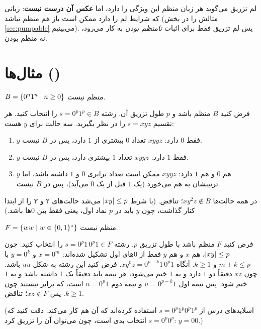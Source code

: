 \begin{warning}
لم تزریق می‌گوید هر زبان منظم این ویژگی را دارد، اما \textbf{عکس آن درست نیست}: زبانی که شرایط لم را دارد ممکن است باز هم منظم نباشد (مثالش را در بخش \ref{sec:pumpable} می‌بینیم). پس لم تزریق فقط برای اثبات \emph{نامنظم بودن} به کار می‌رود، نه منظم بودن.
\end{warning}

\section{مثال‌ها ()}

\begin{example}[$0^n1^n$]\label{ex:0n1n}
$B=\{0^n1^n\mid n\ge0\}$ منظم نیست.

فرض کنید $B$ منظم باشد و $p$ طول تزریق آن. رشته $s=0^p1^p\in B$ را انتخاب کنید. هر تقسیم $s=xyz$ را در نظر بگیرید. سه حالت برای $y$ هست:
\begin{enumerate}
\item $y$ فقط $0$ دارد: $xyyz$ تعداد $0$ بیشتری از $1$ دارد، پس در $B$ نیست.
\item $y$ فقط $1$ دارد: $xyyz$ تعداد $1$ بیشتری دارد، پس در $B$ نیست.
\item $y$ هم $0$ و هم $1$ دارد: $xyyz$ ممکن است تعداد برابری $0$ و $1$ داشته باشد، اما ترتیبشان به هم می‌خورد (یک $1$ قبل از یک $0$ می‌آید)، پس در $B$ نیست.
\end{enumerate}
در همه حالت‌ها $xy^2z\notin B$؛ تناقض. (با شرط $\lvert xy\rvert\le p$ می‌شد حالت‌های ۲ و ۳ را از ابتدا کنار گذاشت، چون $y$ باید در $p$ نماد اول، یعنی فقط بین $0$ها باشد.)
\end{example}

\begin{example}
$F=\{ww\mid w\in\{0,1\}^*\}$ منظم نیست.

فرض کنید $F$ منظم باشد با طول تزریق $p$. رشته $s=0^p1\,0^p1\in F$ را انتخاب کنید. چون $\lvert xy\rvert\le p$، هم $x$ و هم $y$ فقط از $0$های اول تشکیل شده‌اند: $x=0^m$ و $y=0^k$ با $m+k\le p$ و $k\ge1$. آنگاه $xy^0z=0^{p-k}1\,0^p1$. فرض کنید این رشته به شکل $uu$ باشد. چون $xz$ دقیقاً دو $1$ دارد و به $1$ ختم می‌شود، هر نیمه باید دقیقاً یک $1$ داشته باشد و به $1$ ختم شود. پس نیمه اول $u=0^{p-k}1$ و نیمه دوم $u=0^p1$ است، که برابر نیستند چون $k\ge1$. پس $xz\notin F$؛ تناقض.

(اسلایدهای درس از $s=0^p1^p0^p1^p$ استفاده کرده‌اند که آن هم کار می‌کند. دقت کنید که $s=0^p0^p$ انتخاب بدی است، چون می‌توان آن را تزریق کرد: $y=00$.)
\end{example}

